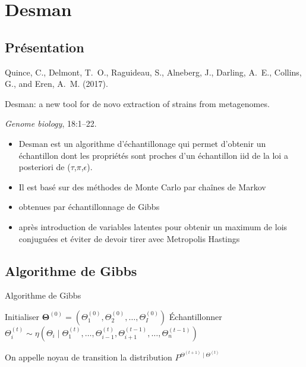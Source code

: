 \documentclass{beamer}
\newcommand{\fr}[1]{#1}
\newcommand{\en}[1]{}
\begin{document}
\section{Desman}
\subsection{Présentation}
\begin{frame}


Quince, C., Delmont, T.~O., Raguideau, S., Alneberg, J., Darling, A.~E.,
  Collins, G., and Eren, A.~M. (2017).

Desman: a new tool for de novo extraction of strains from
  metagenomes.

{\em Genome biology}, 18:1--22.

\end{frame}
\begin{frame}
\begin{itemize}
\item Desman est un algorithme d'échantillonage qui permet d'obtenir un échantillon dont les propriétés sont proches d'un échantillon iid de la loi a posteriori de ($\tau$,$\pi$,$\epsilon$).
\item Il est basé sur des méthodes de Monte Carlo par chaînes de Markov
\item obtenues par échantillonnage de Gibbs
\item après introduction de variables latentes pour obtenir un maximum de lois conjuguées et éviter de devoir tirer avec Metropolis Hastings
\end{itemize}
\end{frame}
\subsection{Algorithme de Gibbs}
\begin{frame}{Algorithme de Gibbs}

    \begin{algorithm}[H]
        \caption{Algorithme de Gibbs}
        \begin{algorithmic}[1]
            \State Initialiser $\mathbf{\Theta}^{(0)} = (\Theta_1^{(0)}, \Theta_2^{(0)}, \ldots, \Theta_I^{(0)})$
                    \State Échantillonner 
                    \State \quad$\Theta_i^{(t)} \sim \eta\left(\Theta_i \mid \Theta_1^{(t)}, \ldots, \Theta_{i-1}^{(t)}, \Theta_{i+1}^{(t-1)}, \ldots, \Theta_n^{(t-1)}\right)$
                \EndFor
            \EndFor
        \end{algorithmic}
    \end{algorithm}
    
    
\en{The transition kernel is the distribution}\fr{On appelle noyau de transition la distribution } $P^{\Theta^{(t+1)}\mid\Theta^{(t)}}$ 
\end{frame}
\end{document}
